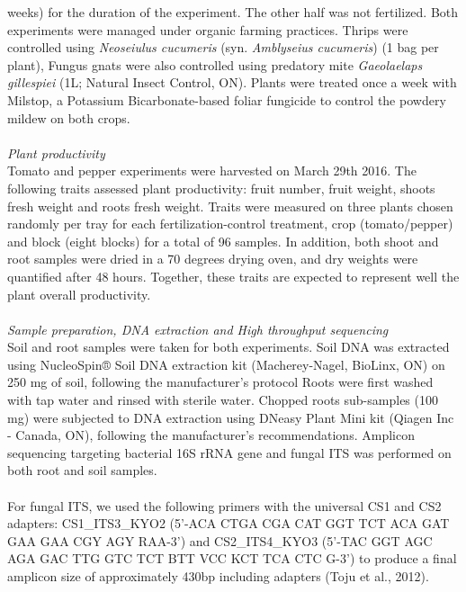 \documentclass[11pt,]{article}
\begin{document}
weeks) for the duration of the experiment. The other half was not
fertilized. Both experiments were managed under organic farming
practices. Thrips were controlled using \emph{Neoseiulus cucumeris}
(syn. \emph{Amblyseius cucumeris}) (1 bag per plant), Fungus gnats were
also controlled using predatory mite \emph{Gaeolaelaps gillespiei} (1L;
Natural Insect Control, ON). Plants were treated once a week with
Milstop, a Potassium Bicarbonate-based foliar fungicide to control the
powdery mildew on both crops.\\
\hspace*{0.333em}\\
\emph{Plant productivity}\\
Tomato and pepper experiments were harvested on March 29th 2016. The
following traits assessed plant productivity: fruit number, fruit
weight, shoots fresh weight and roots fresh weight. Traits were measured
on three plants chosen randomly per tray for each fertilization-control
treatment, crop (tomato/pepper) and block (eight blocks) for a total of
96 samples. In addition, both shoot and root samples were dried in a 70
degrees drying oven, and dry weights were quantified after 48 hours.
Together, these traits are expected to represent well the plant overall
productivity.\\
\hspace*{0.333em}\\
\emph{Sample preparation, DNA extraction and High throughput
sequencing}\\
Soil and root samples were taken for both experiments. Soil DNA was
extracted using NucleoSpin® Soil DNA extraction kit (Macherey-Nagel,
BioLinx, ON) on 250 mg of soil, following the manufacturer's protocol
Roots were first washed with tap water and rinsed with sterile water.
Chopped roots sub-samples (100 mg) were subjected to DNA extraction
using DNeasy Plant Mini kit (Qiagen Inc - Canada, ON), following the
manufacturer's recommendations. Amplicon sequencing targeting bacterial
16S rRNA gene and fungal ITS was performed on both root and soil
samples.\\
\hspace*{0.333em}\\
For fungal ITS, we used the following primers with the universal CS1 and
CS2 adapters: CS1\_ITS3\_KYO2 (5'-ACA CTGA CGA CAT GGT TCT ACA GAT GAA
GAA CGY AGY RAA-3') and CS2\_ITS4\_KYO3 (5'-TAC GGT AGC AGA GAC TTG GTC
TCT BTT VCC KCT TCA CTC G-3') to produce a final amplicon size of
approximately 430bp including adapters (Toju et al., 2012).\\
\end{document}
